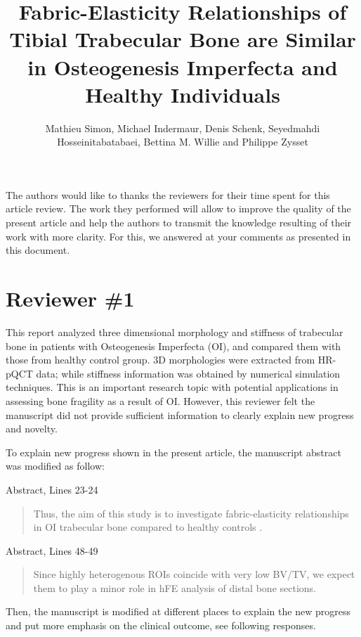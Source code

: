\documentclass{AR2RC}
\title{Fabric-Elasticity Relationships of Tibial Trabecular Bone are Similar in Osteogenesis Imperfecta and Healthy Individuals}
\author{Mathieu Simon, Michael Indermaur, Denis Schenk, Seyedmahdi Hosseinitabatabaei, Bettina	M. Willie and Philippe Zysset}
\begin{document}
\maketitle

\vspace{1em}The authors would like to thanks the reviewers for their time spent for this article review. The work they performed will allow to improve the quality of the present article and help the authors to transmit the knowledge resulting of their work with more clarity. For this, we answered at your comments as presented in this document.

\section{Reviewer \#1}

\RC This report analyzed three dimensional morphology and stiffness of trabecular bone in patients with Osteogenesis Imperfecta (OI), and compared them with those from healthy control group. 3D morphologies were extracted from HR-pQCT data; while stiffness information was obtained by numerical simulation techniques. This is an important research topic with potential applications in assessing bone fragility as a result of OI. However, this reviewer felt the manuscript did not provide sufficient information to clearly explain new progress and novelty.

\AR To explain new progress shown in the present article, the manuscript abstract was modified as follow:\par

Abstract, Lines 23-24
\begin{quote}
	Thus, the aim of this study is to investigate fabric-elasticity relationships in OI trabecular bone compared to healthy controls .
\end{quote}

Abstract, Lines 48-49
\begin{quote}
	 Since highly heterogenous ROIs coincide with very low BV/TV, we expect them to play a minor role in hFE analysis of distal bone sections. 
\end{quote}

Then, the manuscript is modified at different places to explain the new progress and put more emphasis on the clinical outcome, see following responses.
\end{document}
